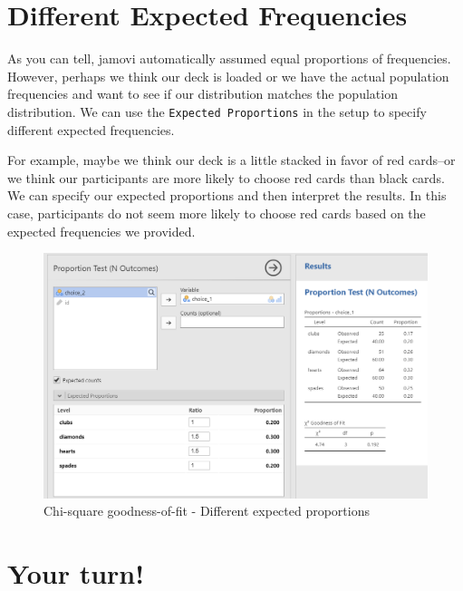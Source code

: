 \documentclass[
]{book}
\begin{document}
\hypertarget{different-expected-frequencies}{%
\section{Different Expected Frequencies}\label{different-expected-frequencies}}

As you can tell, jamovi automatically assumed equal proportions of frequencies. However, perhaps we think our deck is loaded or we have the actual population frequencies and want to see if our distribution matches the population distribution. We can use the \texttt{Expected\ Proportions} in the setup to specify different expected frequencies.

For example, maybe we think our deck is a little stacked in favor of red cards--or we think our participants are more likely to choose red cards than black cards. We can specify our expected proportions and then interpret the results. In this case, participants do not seem more likely to choose red cards based on the expected frequencies we provided.

\begin{figure}

{\centering \includegraphics[width=1\linewidth]{images/09-chi-square/chi-square_results2} 

}

\caption{Chi-square goodness-of-fit - Different expected proportions}\label{fig:unnamed-chunk-6}
\end{figure}

\hypertarget{your-turn-5}{%
\section{Your turn!}\label{your-turn-5}}
\end{document}
